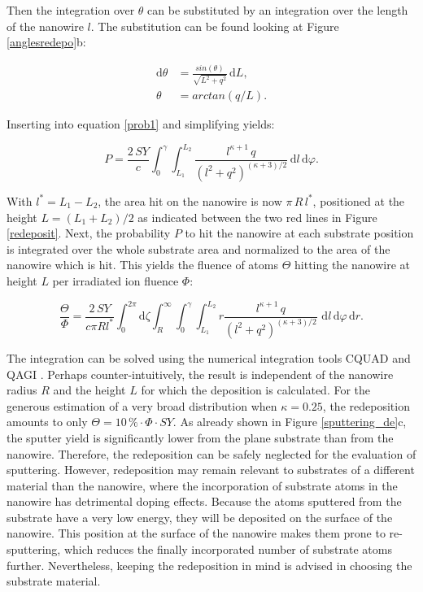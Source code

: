 Then the integration over $\theta$ can be substituted by an integration over the length of the nanowire $l$. The substitution can be found looking at Figure \ref{anglesredepo}b:

\begin{align*}
\mathrm{d}\theta &= \frac{sin(\theta)}{\sqrt{L^2 + q^2}}\,\mathrm{d}L,\\
\theta &= arctan(q/L).
\end{align*}

Inserting into equation \ref{prob1} and simplifying yields:

\begin{equation}
\label{prob2}
P = \frac{2\,SY}{c} \int_0^{\gamma} \! \int_{L_1}^{L_2} \!  \frac{l^{\kappa+1}\,q}{(l^2 + q^2)^{(\kappa + 3)/2}} \,\mathrm{d}l \, \mathrm{d}\varphi.
\end{equation}

With $l^*=L_1-L_2$, the area hit on the nanowire is now $\pi \, R \, l^*$, positioned at the height $L= (L_1+L_2)/2$ as indicated between the two red lines in Figure \ref{redeposit}. Next, the probability $P$ to hit the nanowire at each substrate position is integrated over the whole substrate area and normalized to the area of the nanowire which is hit. This yields the fluence of atoms $\Theta$ hitting the nanowire at height $L$ per irradiated ion fluence $\Phi$:

\begin{equation}
\label{prob3}
\frac{\Theta}{\Phi} = \frac{2\,SY}{c \pi Rl^*} \int_0^{2\pi}\! \mathrm{d}\zeta \int_R^{\infty} \!
\int_0^{\gamma} \! \int_{L_1}^{L_2} \! r \frac{l^{\kappa+1}\,q}{(l^2 + q^2)^{(\kappa + 3)/2}}\,\,\mathrm{d}l \, \mathrm{d}\varphi\,\mathrm{d}r.
\end{equation}

The integration can be solved using the numerical integration tools CQUAD and QAGI \cite{gough_gnu_2009}. Perhaps counter-intuitively, the result is independent of the nanowire radius $R$ and the height $L$ for which the deposition is calculated. For the generous estimation of a very broad distribution when $\kappa = 0.25$, the redeposition amounts to only $\Theta =10\,\% \cdot \Phi\cdot SY$. As already shown in Figure \ref{sputtering_de}c, the sputter yield is significantly lower from the plane substrate than from the nanowire. Therefore, the redeposition can be safely neglected for the evaluation of sputtering. However, redeposition may remain relevant to substrates of a different material than the nanowire, where the incorporation of substrate atoms in the nanowire has detrimental doping effects. Because the atoms sputtered from the substrate have a very low energy, they will be deposited on the surface of the nanowire. This position at the surface of the nanowire makes them prone to re-sputtering, which reduces the finally incorporated number of substrate atoms further. Nevertheless, keeping the redeposition in mind is advised in choosing the substrate material.


